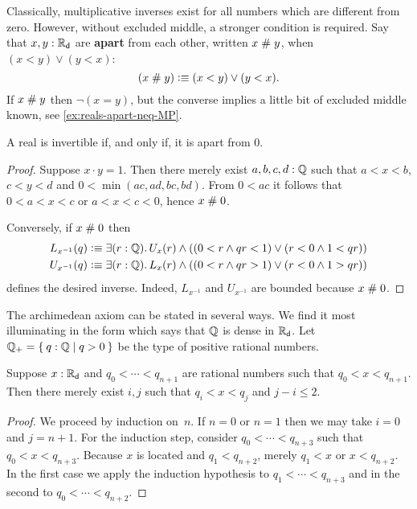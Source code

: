 Classically, multiplicative inverses exist for all numbers which are different from zero.
However, without excluded middle, a stronger condition is required. Say that $x, y : \mathbb{R}_\mathsf{d}$
are \textbf{apart} from each other, written $x \mathrel{\#} y$, when $(x < y) \lor (y < x)$:
%
\begin{equation*}
  (x \mathrel{\#} y) \vcentcolon\equiv (x < y) \lor (y < x).
\end{equation*}
%
If $x \mathrel{\#} y$ then $\lnot (x = y)$, but the converse implies a little bit of excluded
middle known, see \autoref{ex:reals-apart-neq-MP}.

\begin{thm} \label{RD-inverse-apart-0}
  A real is invertible if, and only if, it is apart from $0$.
\end{thm}

\begin{proof}
  Suppose $x \cdot y = 1$. Then there merely exist $a, b, c, d : \mathbb{Q}$ such that
  $a < x < b$, $c < y < d$ and $0 < \min (a c, a d, b c, b d)$. From $0 < a c$ it follows
  that $0 < a < x < c$ or $a < x < c < 0$, hence $x \mathrel{\#} 0$.

  Conversely, if $x \mathrel{\#} 0$ then
  \begin{align*}
    L_{x^{-1}}(q) &\defeq
    \exis{r : \Q} U_x(r) \land ((0 < r \land q r < 1) \lor (r < 0 \land 1 < q r))
    \\
    U_{x^{-1}}(q) &\defeq
    \exis{r : \Q} L_x(r) \land ((0 < r \land q r > 1) \lor (r < 0 \land 1 > q r))
  \end{align*}
  defines the desired inverse. Indeed, $L_{x^{-1}}$ and $U_{x^{-1}}$ are bounded because
  $x \mathrel{\#} 0$.
\end{proof}

The archimedean axiom can be stated in several ways. We find it most illuminating in the
form which says that $\mathbb{Q}$ is dense in $\mathbb{R}_\mathsf{d}$. Let $\Qp = \setof{ q : \Q | q > 0 }$ be the
type of positive rational numbers.

\begin{lem} \label{RD-multi-located}
  Suppose $x : \mathbb{R}_\mathsf{d}$ and $q_0 < \cdots < q_{n+1}$ are rational numbers such that $q_0 < x <
  q_{n+1}$. Then there merely exist $i, j$ such that $q_i < x < q_j$ and $j - i \leq 2$.
\end{lem}

\begin{proof}
  We proceed by induction on~$n$. If $n = 0$ or $n = 1$ then we may take $i = 0$ and $j =
  n + 1$. For the induction step, consider $q_0 < \cdots < q_{n+3}$ such that $q_0 < x <
  q_{n+3}$. Because $x$ is located and $q_1 < q_{n+2}$, merely $q_1 < x$ or $x < q_{n+2}$.
  In the first case we apply the induction hypothesis to $q_1 < \cdots < q_{n+3}$ and in
  the second to $q_0 < \cdots < q_{n+2}$.
\end{proof}

